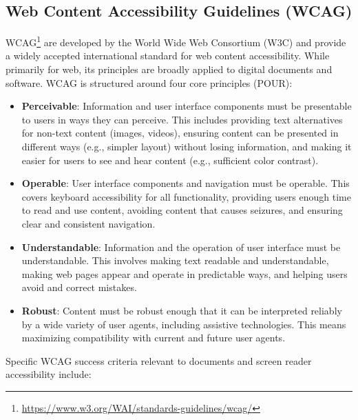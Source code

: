 \subsection{Web Content Accessibility Guidelines (WCAG)}
WCAG\footnote{\url{https://www.w3.org/WAI/standards-guidelines/wcag/}} are developed by the World Wide Web Consortium (W3C) and provide a widely accepted international standard for web content accessibility. While primarily for web, its principles are broadly applied to digital documents and software. WCAG is structured around four core principles (POUR):
\begin{itemize}
    \item \textbf{Perceivable}: Information and user interface components must be presentable to users in ways they can perceive. This includes providing text alternatives for non-text content (images, videos), ensuring content can be presented in different ways (e.g., simpler layout) without losing information, and making it easier for users to see and hear content (e.g., sufficient color contrast).
    \item \textbf{Operable}: User interface components and navigation must be operable. This covers keyboard accessibility for all functionality, providing users enough time to read and use content, avoiding content that causes seizures, and ensuring clear and consistent navigation.
    \item \textbf{Understandable}: Information and the operation of user interface must be understandable. This involves making text readable and understandable, making web pages appear and operate in predictable ways, and helping users avoid and correct mistakes.
    \item \textbf{Robust}: Content must be robust enough that it can be interpreted reliably by a wide variety of user agents, including assistive technologies. This means maximizing compatibility with current and future user agents.
\end{itemize}
Specific WCAG success criteria relevant to documents and screen reader accessibility include:

